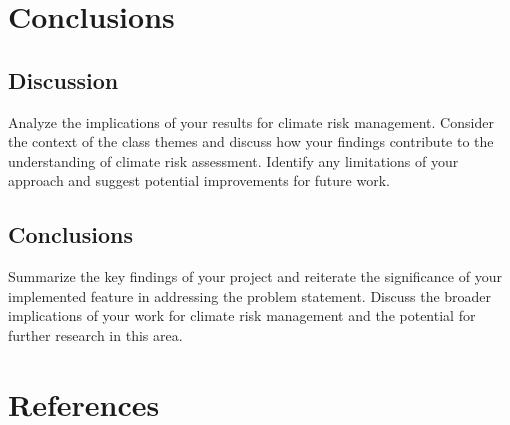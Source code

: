 \documentclass[
  11pt,
]{article}
\newlength{\cslhangindent}
\newenvironment{CSLReferences}[2] %
 {\begin{list}{}{%
  \setlength{\itemindent}{0pt}
  \setlength{\leftmargin}{0pt}
  \setlength{\parsep}{0pt}
  \ifodd #1
   \setlength{\leftmargin}{\cslhangindent}
   \setlength{\itemindent}{-1\cslhangindent}
  \fi
  \setlength{\itemsep}{#2\baselineskip}}}
 {\end{list}}
\begin{document}
\section{Conclusions}\label{conclusions}

\subsection{Discussion}\label{discussion}

Analyze the implications of your results for climate risk management.
Consider the context of the class themes and discuss how your findings
contribute to the understanding of climate risk assessment. Identify any
limitations of your approach and suggest potential improvements for
future work.

\subsection{Conclusions}\label{conclusions-1}

Summarize the key findings of your project and reiterate the
significance of your implemented feature in addressing the problem
statement. Discuss the broader implications of your work for climate
risk management and the potential for further research in this area.

\section{References}\label{references}

\label{refs}
\begin{CSLReferences}{0}{1}
\end{CSLReferences}
\end{document}
